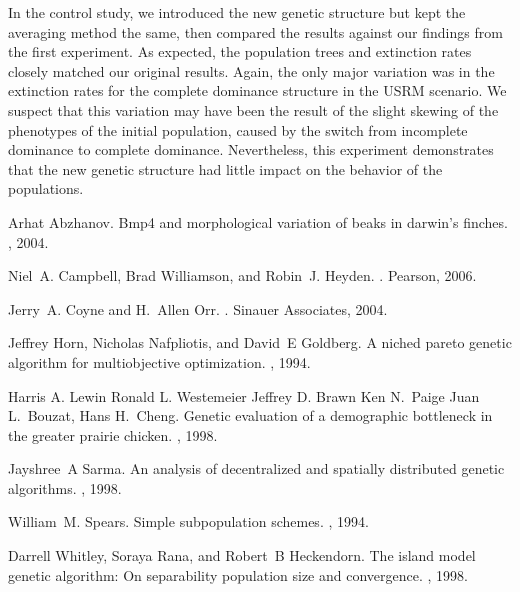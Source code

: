 \documentclass[conference]{IEEEtran}
\begin{document}
In the control study, we introduced the new genetic structure but kept the averaging method the same, then compared the results against our findings from the first experiment. As expected, the population trees and extinction rates closely matched our original results. Again, the only major variation was in the extinction rates for the complete dominance structure in the USRM scenario. We suspect that this variation may have been the result of the slight skewing of the phenotypes of the initial population, caused by the switch from incomplete dominance to complete dominance. Nevertheless, this experiment demonstrates that the new genetic structure had little impact on the behavior of the populations.


\begin{thebibliography}{1}

Arhat Abzhanov.
\newblock Bmp4 and morphological variation of beaks in darwin's finches.
, 2004.

Niel~A. Campbell, Brad Williamson, and Robin~J. Heyden.
.
\newblock Pearson, 2006.

Jerry~A. Coyne and H.~Allen Orr.
.
\newblock Sinauer Associates, 2004.

Jeffrey Horn, Nicholas Nafpliotis, and David~E Goldberg.
\newblock A niched pareto genetic algorithm for multiobjective optimization.
, 1994.

Harris A. Lewin Ronald L. Westemeier Jeffrey D. Brawn Ken N.~Paige Juan
  L.~Bouzat, Hans H.~Cheng.
\newblock Genetic evaluation of a demographic bottleneck in the greater prairie
  chicken.
, 1998.

Jayshree~A Sarma.
\newblock An analysis of decentralized and spatially distributed genetic
  algorithms.
, 1998.

William~M. Spears.
\newblock Simple subpopulation schemes.
, 1994.

Darrell Whitley, Soraya Rana, and Robert~B Heckendorn.
\newblock The island model genetic algorithm: On separability population size
  and convergence.
, 1998.

\end{thebibliography}







\end{document}
